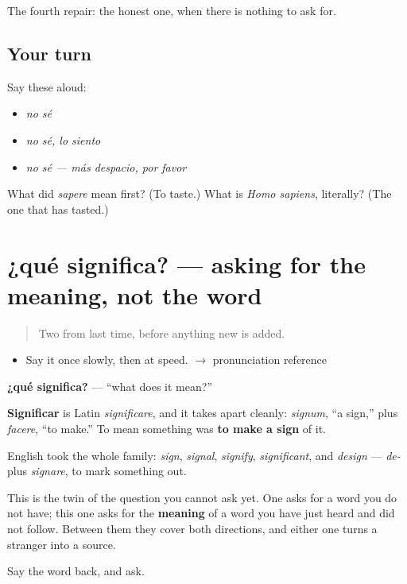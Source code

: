 \begin{grammarlens}[title={What you've built}]
The fourth repair: the honest one, when there is nothing to ask for.
\end{grammarlens}

\subsection*{Your turn}
Say these aloud:

\begin{itemize}
\raggedright
  \item \emph{no sé}
  \item \emph{no sé, lo siento}
  \item \emph{no sé — más despacio, por favor}
\end{itemize}

\begin{tcolorbox}[breakable,colback=teal!4,colframe=teal!35!black,title={Before you move on}]
What did \emph{sapere} mean first? (To taste.) What is \emph{Homo sapiens}, literally? (The one that has tasted.)
\end{tcolorbox}
\section[¿qué significa?]{¿qué significa? — asking for the meaning, not the word}

\label{lesson:ES-C303-que-significa}



\begin{quote}
Two from last time, before anything new is added.
\end{quote}

\begin{sounds}
\begin{itemize}
\raggedright
  \item Say it once slowly, then at speed. $\to$ pronunciation reference
\end{itemize}
\end{sounds}

\begin{cousinweb}
\textbf{¿qué significa?} — \textquotedblleft{}what does it mean?\textquotedblright{}

\textbf{Significar} is Latin \emph{significare}, and it takes apart cleanly: \emph{signum}, \textquotedblleft{}a sign,\textquotedblright{} plus \emph{facere}, \textquotedblleft{}to make.\textquotedblright{} To mean something was \textbf{to make a sign} of it.

English took the whole family: \emph{sign}, \emph{signal}, \emph{signify}, \emph{significant}, and \emph{design} — \emph{de-} plus \emph{signare}, to mark something out.

This is the twin of the question you cannot ask yet. One asks for a word you do not have; this one asks for the \textbf{meaning} of a word you have just heard and did not follow. Between them they cover both directions, and either one turns a stranger into a source.

Say the word back, and ask.
\end{cousinweb}

